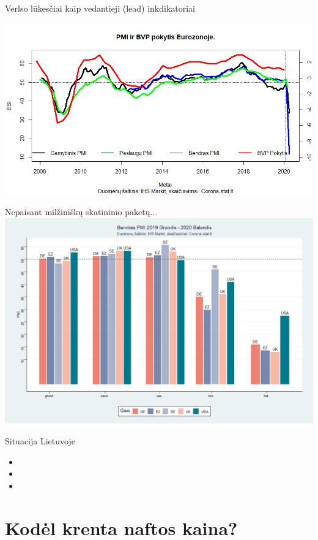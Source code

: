 \documentclass[11pt]{beamer}
\begin{document}
\begin{frame}{Verlso lūkesčiai kaip vedantieji (lead) inkdikatoriai}
\begin{scriptsize}
\end{scriptsize}
\includegraphics[scale=0.5]{Rplot05.png}
\end{frame}

\begin{frame}{Nepaisant milžiniškų skatinimo paketų...}
\includegraphics[scale=0.3]{tomas_1.png}
\end{frame}

\begin{frame}{Situacija Lietuvoje}
\begin{itemize}
\item 
\item 
\item 
\end{itemize}
\end{frame}



\section{Kodėl krenta naftos kaina?}
\end{document}
